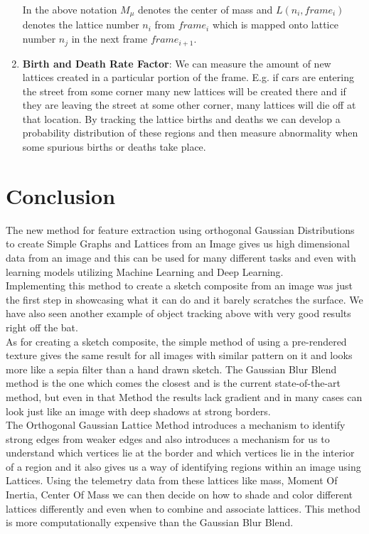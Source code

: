 \documentclass{article}
\begin{document}
\begin{enumerate}
    In the above notation $M_{\mu}$ denotes the center of mass and $L(n_i, frame_i)$ denotes the lattice number $n_i$ from $frame_i$ which is mapped onto lattice number $n_j$ in the next frame $frame_{i + 1}$.
    
    \item \textbf{Birth and Death Rate Factor}: We can measure the amount of new lattices created in a particular portion of the frame. E.g. if cars are entering the street from some corner many new lattices will be created there and if they are leaving the street at some other corner, many lattices will die off at that location. By tracking the lattice births and deaths we can develop a probability distribution of these regions and then measure abnormality when some spurious births or deaths take place.
    
\end{enumerate}

\clearpage
\section{Conclusion}
The new method for feature extraction using orthogonal Gaussian Distributions to create Simple Graphs and Lattices from an Image gives us high dimensional data from an image and this can be used for many different tasks and even with learning models utilizing Machine Learning and Deep Learning. \\

Implementing this method to create a sketch composite from an image was just the first step in showcasing what it can do and it barely scratches the surface. We have also seen another example of object tracking above with very good results right off the bat. \\

As for creating a sketch composite, the simple method of using a pre-rendered texture gives the same result for all images with similar pattern on it and looks more like a sepia filter than a hand drawn sketch. The Gaussian Blur Blend method is the one which comes the closest and is the current state-of-the-art method, but even in that Method the results lack gradient and in many cases can look just like an image with deep shadows at strong borders. \\

The Orthogonal Gaussian Lattice Method introduces a mechanism to identify strong edges from weaker edges and also introduces a mechanism for us to understand which vertices lie at the border and which vertices lie in the interior of a region and it also gives us a way of identifying regions within an image using Lattices. Using the telemetry data from these lattices like mass, Moment Of Inertia, Center Of Mass we can then decide on how to shade and color different lattices differently and even when to combine and associate lattices. This method is more computationally expensive than the Gaussian Blur Blend. \\
\end{document}
